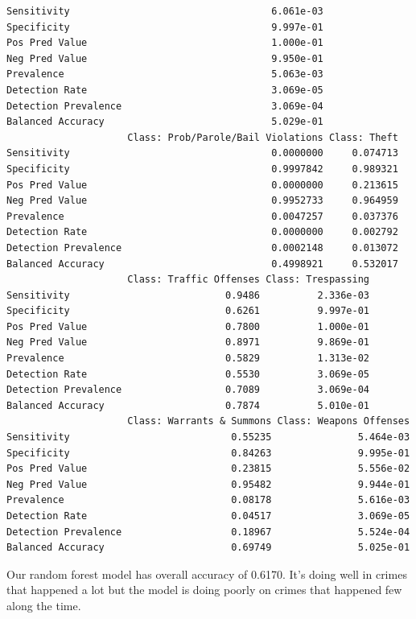 \documentclass[
  article]{jss}
\begin{document}
\begin{verbatim}
Sensitivity                                   6.061e-03
Specificity                                   9.997e-01
Pos Pred Value                                1.000e-01
Neg Pred Value                                9.950e-01
Prevalence                                    5.063e-03
Detection Rate                                3.069e-05
Detection Prevalence                          3.069e-04
Balanced Accuracy                             5.029e-01
                     Class: Prob/Parole/Bail Violations Class: Theft
Sensitivity                                   0.0000000     0.074713
Specificity                                   0.9997842     0.989321
Pos Pred Value                                0.0000000     0.213615
Neg Pred Value                                0.9952733     0.964959
Prevalence                                    0.0047257     0.037376
Detection Rate                                0.0000000     0.002792
Detection Prevalence                          0.0002148     0.013072
Balanced Accuracy                             0.4998921     0.532017
                     Class: Traffic Offenses Class: Trespassing
Sensitivity                           0.9486          2.336e-03
Specificity                           0.6261          9.997e-01
Pos Pred Value                        0.7800          1.000e-01
Neg Pred Value                        0.8971          9.869e-01
Prevalence                            0.5829          1.313e-02
Detection Rate                        0.5530          3.069e-05
Detection Prevalence                  0.7089          3.069e-04
Balanced Accuracy                     0.7874          5.010e-01
                     Class: Warrants & Summons Class: Weapons Offenses
Sensitivity                            0.55235               5.464e-03
Specificity                            0.84263               9.995e-01
Pos Pred Value                         0.23815               5.556e-02
Neg Pred Value                         0.95482               9.944e-01
Prevalence                             0.08178               5.616e-03
Detection Rate                         0.04517               3.069e-05
Detection Prevalence                   0.18967               5.524e-04
Balanced Accuracy                      0.69749               5.025e-01
\end{verbatim}

Our random forest model has overall accuracy of 0.6170. It's doing well
in crimes that happened a lot but the model is doing poorly on crimes
that happened few along the time.
\end{document}
